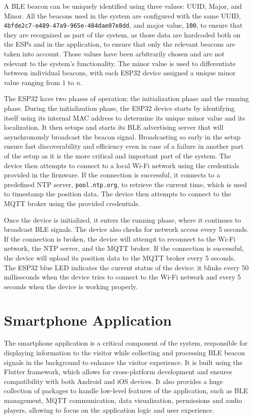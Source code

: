 A BLE beacon can be uniquely identified using three values: UUID, Major, and Minor. All the beacons used in the system are configured with the same UUID, \texttt{4bfde2c7-e489-47a9-965e-484dae07e8dd}, and major value, \texttt{100}, to ensure that they are recognized as part of the system, as those data are hardcoded both on the ESPs and in the application, to ensure that only the relevant beacons are taken into account. Those values have been arbitrarily chosen and are not relevant to the system's functionality. The minor value is used to differentiate between individual beacons, with each ESP32 device assigned a unique minor value ranging from $1$ to $n$.

The ESP32 have two phases of operation: the initialization phase and the running phase. During the initialization phase, the ESP32 device starts by identifying itself using its internal MAC address to determine its unique minor value and its localization. It then setups and starts its BLE advertising server that will asynchronously broadcast the beacon signal. Broadcasting so early in the setup ensure fast discoverability and efficiency even in case of a failure in another part of the setup as it is the more critical and important part of the system. The device then attempts to connect to a local Wi-Fi network using the credentials provided in the firmware. If the connection is successful, it connects to a predefined NTP server, \texttt{pool.ntp.org}, to retrieve the current time, which is used to timestamp the position data. The device then attempts to connect to the MQTT broker using the provided credentials. 

Once the device is initialized, it enters the running phase, where it continues to broadcast BLE signals. The device also checks for network access every 5 seconds. If the connection is broken, the device will attempt to reconnect to the Wi-Fi network, the NTP server, and the MQTT broker. If the connection is successful, the device will upload its position data to the MQTT broker every 5 seconds. The ESP32 blue LED indicates the current status of the device: it blinks every 50 milliseconds when the device tries to connect to the Wi-Fi network and every 5 seconds when the device is working properly.

\section{Smartphone Application}
The smartphone application is a critical component of the system, responsible for displaying information to the visitor while collecting and processing BLE beacon signals in the background to enhance the visitor experience. It is built using the Flutter framework, which allows for cross-platform development and ensures compatibility with both Android and iOS devices. It also provides a huge collection of packages to handle low-level features of the application, such as BLE management, MQTT communication, data visualization, permissions and audio players, allowing to focus on the application logic and user experience.

